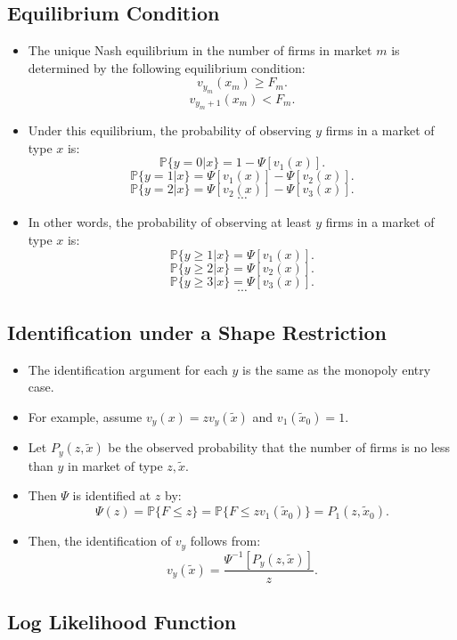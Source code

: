 \documentclass[]{book}
\providecommand{\tightlist}{%
  \setlength{\itemsep}{0pt}\setlength{\parskip}{0pt}}
\begin{document}
\subsection{Equilibrium Condition}\label{equilibrium-condition}

\begin{itemize}
\item
  The unique Nash equilibrium in the number of firms in market \(m\) is
  determined by the following equilibrium condition: \[
  v_{y_m}(x_m) \ge F_m.
  \] \[
  v_{y_m + 1}(x_m) < F_m.
  \]
\item
  Under this equilibrium, the probability of observing \(y\) firms in a
  market of type \(x\) is: \[
  \mathbb{P}\{y = 0|x\} = 1 - \Psi[v_1(x)].
  \] \[
  \mathbb{P}\{y = 1|x\} = \Psi[v_1(x)] - \Psi[v_2(x)].
  \] \[
  \mathbb{P}\{y = 2|x\} = \Psi[v_2(x)] - \Psi[v_3(x)].
  \] \[
  \cdots
  \]
\item
  In other words, the probability of observing at least \(y\) firms in a
  market of type \(x\) is: \[
  \mathbb{P}\{y \ge 1|x\} = \Psi[v_1(x)].
  \] \[
  \mathbb{P}\{y \ge 2|x\} = \Psi[v_2(x)].
  \] \[
  \mathbb{P}\{y \ge 3|x\} = \Psi[v_3(x)].
  \] \[
  \cdots
  \]
\end{itemize}

\subsection{Identification under a Shape
Restriction}\label{identification-under-a-shape-restriction}

\begin{itemize}
\tightlist
\item
  The identification argument for each \(y\) is the same as the monopoly
  entry case.
\item
  For example, assume \(v_y(x) = z v_y(\tilde{x})\) and
  \(v_1(\tilde{x}_0) = 1\).
\item
  Let \(P_y(z, \tilde{x})\) be the observed probability that the number
  of firms is no less than \(y\) in market of type \(z, \tilde{x}\).
\item
  Then \(\Psi\) is identified at \(z\) by: \[
  \Psi(z) = \mathbb{P}\{F \le z\} = \mathbb{P}\{F \le z v_1(\tilde{x}_0)\} = P_1(z, \tilde{x}_0).
  \]
\item
  Then, the identification of \(v_y\) follows from: \[
  v_y(\tilde{x}) = \frac{\Psi^{-1}[P_y(z, \tilde{x})]}{z}.
  \]
\end{itemize}

\subsection{Log Likelihood Function}\label{log-likelihood-function}
\end{document}
